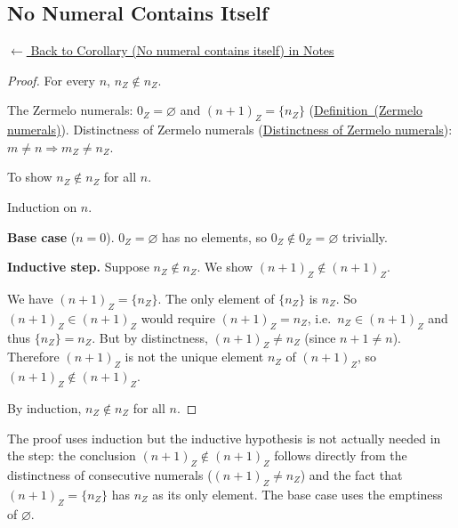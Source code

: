 
\subsection*{No Numeral Contains Itself}
\label{prf:zermelo-no-self-membership}

\begin{remark*}[Return]
\hyperref[cor:zermelo-no-self-membership]{$\leftarrow$ Back to Corollary (No numeral contains itself) in Notes}
\end{remark*}

\begin{proof}
\Claim For every $n$, $n_Z \notin n_Z$.

\Given The Zermelo numerals: $0_Z = \varnothing$ and $(n+1)_Z = \{n_Z\}$
(\hyperref[def:zermelo-numerals]{Definition~(Zermelo numerals)}). Distinctness
of Zermelo numerals (\hyperref[prop:zermelo-distinct]{Distinctness of Zermelo
numerals}): $m \neq n \Rightarrow m_Z \neq n_Z$.

\Goal To show $n_Z \notin n_Z$ for all $n$.

\Strategy Induction on $n$.

\medskip
\noindent\textbf{Base case} ($n = 0$). $0_Z = \varnothing$ has no elements, so
$0_Z \notin 0_Z = \varnothing$ trivially. \checkbox

\medskip
\noindent\textbf{Inductive step.} Suppose $n_Z \notin n_Z$. We show $(n+1)_Z
\notin (n+1)_Z$.

We have $(n+1)_Z = \{n_Z\}$. The only element of $\{n_Z\}$ is $n_Z$. So
$(n+1)_Z \in (n+1)_Z$ would require $(n+1)_Z = n_Z$, i.e.\ $n_Z \in (n+1)_Z$
and thus $\{n_Z\} = n_Z$. But by distinctness, $(n+1)_Z \neq n_Z$ (since $n+1
\neq n$). Therefore $(n+1)_Z$ is not the unique element $n_Z$ of $(n+1)_Z$,
so $(n+1)_Z \notin (n+1)_Z$. \checkbox

By induction, $n_Z \notin n_Z$ for all $n$. \AsReq
\end{proof}

\begin{remark*}
The proof uses induction but the inductive hypothesis is not actually needed in
the step: the conclusion $(n+1)_Z \notin (n+1)_Z$ follows directly from the
distinctness of consecutive numerals ($(n+1)_Z \neq n_Z$) and the fact that
$(n+1)_Z = \{n_Z\}$ has $n_Z$ as its only element. The base case uses the
emptiness of $\varnothing$.
\end{remark*}

